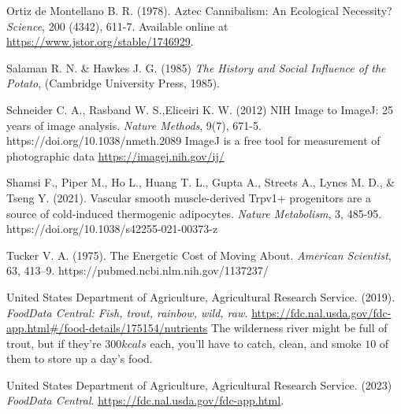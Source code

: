 \documentclass[jou]{apa7}
\begin{document}
\begin{thebibliography}{99}
Ortiz de Montellano B. R.
(1978).
Aztec Cannibalism: An Ecological Necessity?
\textit{Science}, 200 (4342), 611-7.
Available online at \url{https://www.jstor.org/stable/1746929}.

Salaman R. N. \& Hawkes J. G.
(1985)
\textit{The History and Social Influence of the Potato},
(Cambridge University Press, 1985).

%
Schneider C. A., Rasband W. S.,Eliceiri K. W.
(2012)
NIH Image to ImageJ: 25 years of image analysis.
\textit{Nature Methods},
9(7), 671-5.
https://doi.org/10.1038/nmeth.2089
ImageJ is a free tool for measurement of photographic data 
\url{https://imagej.nih.gov/ij/}

Shamsi F., Piper M., Ho L., Huang T. L., Gupta A., Streets A., Lynes M. D., \& Tseng Y. 
 (2021).
Vascular smooth muscle-derived Trpv1+ progenitors are a source of cold-induced thermogenic adipocytes.
\textit{Nature Metabolism},
3, 485-95.
https://doi.org/10.1038/s42255-021-00373-z

Tucker V. A. 
(1975).
The Energetic Cost of Moving About.
\textit{American Scientist},
63, 413--9.
https://pubmed.ncbi.nlm.nih.gov/1137237/

United States Department of Agriculture, Agricultural Research Service.
(2019).
\textit{FoodData Central: Fish, trout, rainbow, wild, raw.}
\url{https://fdc.nal.usda.gov/fdc-app.html#/food-details/175154/nutrients}
The wilderness river might be full of trout, but if they're $300kcals$ each, you'll have to catch, clean, and smoke $10$ of them to store up a day's food.

United States Department of Agriculture, Agricultural Research Service.
(2023)
\textit{FoodData Central}. 
\url{https://fdc.nal.usda.gov/fdc-app.html}.  


\end{thebibliography}
\end{document}

